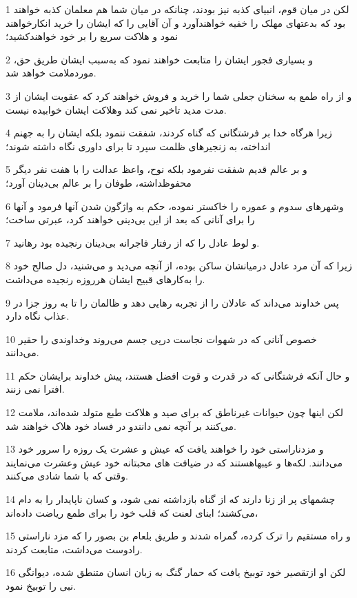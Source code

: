 \par 1 لکن در میان قوم، انبیای کذبه نیز بودند، چنانکه در میان شما هم معلمان کذبه خواهند بود که بدعتهای مهلک را خفیه خواهندآورد و آن آقایی را که ایشان را خرید انکارخواهند نمود و هلاکت سریع را بر خود خواهندکشید؛
\par 2 و بسیاری فجور ایشان را متابعت خواهند نمود که به‌سبب ایشان طریق حق، موردملامت خواهد شد.
\par 3 و از راه طمع به سخنان جعلی شما را خرید و فروش خواهند کرد که عقوبت ایشان از مدت مدید تاخیر نمی کند وهلاکت ایشان خوابیده نیست.
\par 4 زیرا هرگاه خدا بر فرشتگانی که گناه کردند، شفقت ننمود بلکه ایشان را به جهنم انداخته، به زنجیرهای ظلمت سپرد تا برای داوری نگاه داشته شوند؛
\par 5 و بر عالم قدیم شفقت نفرمود بلکه نوح، واعظ عدالت را با هفت نفر دیگر محفوظداشته، طوفان را بر عالم بی‌دینان آورد؛
\par 6 وشهرهای سدوم و عموره را خاکستر نموده، حکم به واژگون شدن آنها فرمود و آنها را برای آنانی که بعد از این بی‌دینی خواهند کرد، عبرتی ساخت؛
\par 7 و لوط عادل را که از رفتار فاجرانه بی‌دینان رنجیده بود رهانید.
\par 8 زیرا که آن مرد عادل درمیانشان ساکن بوده، از آنچه می‌دید و می‌شنید، دل صالح خود را به‌کارهای قبیح ایشان هرروزه رنجیده می‌داشت.
\par 9 پس خداوند می‌داند که عادلان را از تجربه رهایی دهد و ظالمان را تا به روز جزا در عذاب نگاه دارد.
\par 10 خصوص آنانی که در شهوات نجاست در‌پی جسم می‌روند وخداوندی را حقیر می‌دانند.
\par 11 و حال آنکه فرشتگانی که در قدرت و قوت افضل هستند، پیش خداوند برایشان حکم افترا نمی زنند.
\par 12 لکن اینها چون حیوانات غیرناطق که برای صید و هلاکت طبع متولد شده‌اند، ملامت می‌کنند بر آنچه نمی دانندو در فساد خود هلاک خواهند شد.
\par 13 و مزدناراستی خود را خواهند یافت که عیش و عشرت یک روزه را سرور خود می‌دانند. لکه‌ها و عیبهاهستند که در ضیافت های محبتانه خود عیش وعشرت می‌نمایند وقتی که با شما شادی می‌کنند.
\par 14 چشمهای پر از زنا دارند که از گناه بازداشته نمی شود، و کسان ناپایدار را به دام می‌کشند؛ ابنای لعنت که قلب خود را برای طمع ریاضت داده‌اند،
\par 15 و راه مستقیم را ترک کرده، گمراه شدند و طریق بلعام بن بصور را که مزد ناراستی رادوست می‌داشت، متابعت کردند.
\par 16 لکن او ازتقصیر خود توبیخ یافت که حمار گنگ به زبان انسان متنطق شده، دیوانگی نبی را توبیخ نمود.
